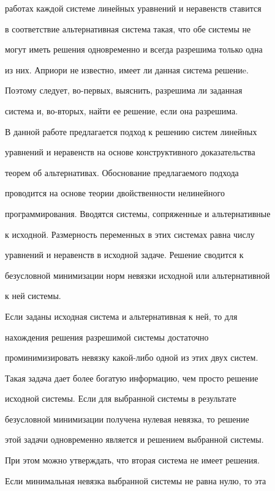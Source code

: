 работах каждой системе линейных уравнений и неравенств ставится


в соответствие альтернативная система такая, что обе системы не


могут иметь решения одновременно и всегда разрешима только одна


из них. Априори не известно, имеет ли данная система решениe.


Поэтому следует, во-первых, выяснить, разрешима ли заданная


система и, во-вторых, найти ее решение, если она разрешима.





В данной работе предлагается подход к решению систем линейных


уравнений и неравенств на основе конструктивного доказательства


теорем об альтернативах. Обоснование предлагаемого подхода


проводится на основе теории двойственности нелинейного


программирования. Вводятся системы, сопряженные и альтернативные


к исходной. Размерность переменных в этих системах равна числу


уравнений и неравенств в исходной задаче. Решение сводится к


безусловной минимизации норм невязки исходной или альтернативной


к ней системы.





Если заданы исходная система и альтернативная к ней, то для


нахождения решения разрешимой системы достаточно


проминимизировать невязку какой-либо одной из этих двух систем.


Такая задача дает более богатую информацию, чем просто решение


исходной системы. Если для выбранной системы в результате


безусловной минимизации получена нулевая невязка, то решение


этой задачи одновременно является и решением выбранной системы.


При этом можно утверждать, что вторая система не имеет решения.


Если минимальная невязка выбранной системы не равна нулю, то эта


